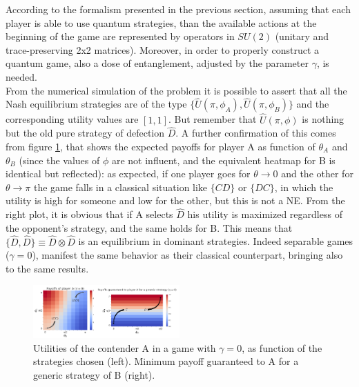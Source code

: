 According to the formalism presented in the previous section, assuming that each player is able to use quantum strategies, than the available actions at the beginning of the game are represented by operators in $SU(2)$ (unitary and trace-preserving 2x2 matrices). Moreover, in order to properly construct a quantum game, also a dose of entanglement, adjusted by the parameter $\gamma$, is needed.\\
From the numerical simulation of the problem it is possible to assert that all the Nash equilibrium strategies are of the type $\{\hat{U}(\pi,\phi_A),\hat{U}(\pi,\phi_B)\}$ and the corresponding utility values are $[1,1]$. But remember that $\hat{U}(\pi,\phi)$ is nothing but the old pure strategy of defection $\hat{D}$. A further confirmation of this comes from figure \ref{fig:utilA_gamma0}, that shows the expected payoffs for player A as function of $\theta_A$ and $\theta_B$ (since the values of $\phi$ are not influent, and the equivalent heatmap for B is identical but reflected): as expected, if one player goes for $\theta\to 0$ and the other for $\theta\to\pi$ the game falls in a classical situation like $\{CD\}$ or $\{DC\}$, in which the utility is high for someone and low for the other, but this is not a NE. From the right plot, it is obvious that if A selects $\hat{D}$ his utility is maximized regardless of the opponent's strategy, and the same holds for B. This means that $\{\hat{D},\hat{D}\}\equiv\hat{D}\otimes\hat{D}$ is an equilibrium in dominant strategies. Indeed separable games ($\gamma=0$), manifest the same behavior as their classical counterpart, bringing also to the same results.\\	

\begin{figure}[!ht]
	\centering
	\includegraphics[width=0.5\textwidth]{pictures/utilities_gamma0.pdf}
	\caption{Utilities of the contender A in a game with $\gamma=0$, as function of the strategies chosen (left). Minimum payoff guaranteed to A for a generic strategy of B (right).}
	\label{fig:utilA_gamma0}
\end{figure}

